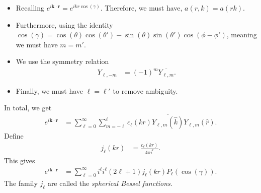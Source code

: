 \documentclass[10pt]{mypackage}
\begin{document}
  \begin{itemize}
    \item Recalling $e^{i\mathbf{k}\cdot \mathbf{r}} = e^{ikr\cos\left( \gamma \right)}$. Therefore, we must have, $a\left( r,k \right) = a\left( rk \right)$. 
    \item Furthermore, using the identity $\cos\left( \gamma \right) = \cos\left( \theta \right)\cos\left( \theta' \right) - \sin\left( \theta \right)\sin\left( \theta' \right)\cos\left( \phi-\phi' \right)$, meaning we must have $m = m'$.
    \item We use the symmetry relation
      \begin{align*}
        Y_{\ell,-m} &= \left( -1 \right)^{m} \overline{Y_{\ell,m}}.
      \end{align*}
    \item Finally, we must have $\ell = \ell'$ to remove ambiguity.
  \end{itemize}
  In total, we get
  \begin{align*}
    e^{i\mathbf{k}\cdot\mathbf{r}} &= \sum_{\ell=0}^{\infty}\sum_{m=-\ell}^{\ell} c_{\ell}\left( kr \right) \overline{Y_{\ell, m}\left( \hat{k} \right)}Y_{\ell,m}\left( \hat{r} \right).
  \end{align*}
  Define
  \begin{align*}
    j_{\ell}\left( kr \right) &= \frac{c_{\ell}\left( kr \right)}{4\pi i^{\ell}}.
  \end{align*}
  This gives
  \begin{align*}
    e^{i\mathbf{k}\cdot \mathbf{r}} &= \sum_{\ell=0}^{\infty}i^{\ell} i^{\ell}\left( 2\ell + 1 \right)j_{\ell}\left( kr \right) P_{\ell}\left( \cos\left( \gamma \right) \right).
  \end{align*}
  The family $j_{\ell}$ are called the \textit{spherical Bessel functions}.\newline
\end{document}
